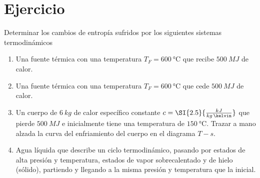 \section{Ejercicio}\label{ej:Chap07Ejercicio11}
Determinar los cambios de entropía sufridos por los siguientes sistemas termodinámicos
\begin{enumerate}
    \item Una fuente térmica con una temperatura $T_F=\SI{600}{\celsius}$ que recibe $\SI{500}{MJ}$ de calor.
    \item Una fuente térmica con una temperatura $T_F=\SI{600}{\celsius}$ que cede $\SI{500}{MJ}$ de calor.
    \item Un cuerpo de $\SI{6}{kg}$ de calor específico constante $c=\SI{2.5}{\frac{kJ}{kg\,\kelvin}}$ que pierde $\SI{500}{MJ}$ e inicialmente tiene una temperatura de $\SI{150}{\celsius}$. Trazar a mano alzada la curva del enfriamiento del cuerpo en el diagrama $T-s$.
    \item Agua líquida que describe un ciclo termodinámico, pasando por estados de alta presión y temperatura, estados de vapor sobrecalentado y de hielo (sólido), partiendo y llegando a la misma presión y temperatura que la inicial.
\end{enumerate}
